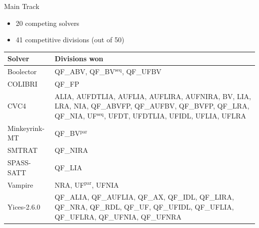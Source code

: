 \documentclass{beamer}
\begin{document}
\begin{frame}{Main Track}
  \begin{itemize}
  \item 20 competing solvers
  \item 41 competitive divisions (out of 50)
  \end{itemize}

  \vspace{-.5cm}
  
  \begin{center}
    \begin{tabular}{lp{}}
      Solver        & Divisions won \\ \hline
      Boolector     & {\small QF\_ABV, QF\_BV$^\text{seq}$, QF\_UFBV}\\
      COLIBRI       & {\small QF\_FP}\\
      CVC4          & {\small ALIA, AUFDTLIA, AUFLIA, AUFLIRA, AUFNIRA, BV, LIA, LRA, NIA, QF\_ABVFP, QF\_AUFBV, QF\_BVFP, QF\_LRA, QF\_NIA, UF$^\text{seq}$, UFDT, UFDTLIA, UFIDL, UFLIA, UFLRA}\\
      Minkeyrink-MT & {\small QF\_BV$^\text{par}$}\\
      SMTRAT        & {\small QF\_NIRA}\\
      SPASS-SATT    & {\small QF\_LIA}\\
      Vampire       & {\small NRA, UF$^\text{par}$, UFNIA}\\
      Yices-2.6.0   & {\small QF\_ALIA, QF\_AUFLIA, QF\_AX, QF\_IDL, QF\_LIRA, QF\_NRA, QF\_RDL, QF\_UF, QF\_UFIDL, QF\_UFLIA, QF\_UFLRA, QF\_UFNIA, QF\_UFNRA}
    \end{tabular}
  \end{center}

  \vspace{-6.75cm}

  \pause
  

  \vspace{3.2cm}
 
\end{frame}
\end{document}
